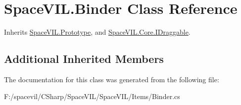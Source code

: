 \hypertarget{class_space_v_i_l_1_1_binder}{}\section{Space\+V\+I\+L.\+Binder Class Reference}
\label{class_space_v_i_l_1_1_binder}


Inherits \mbox{\hyperlink{class_space_v_i_l_1_1_prototype}{Space\+V\+I\+L.\+Prototype}}, and \mbox{\hyperlink{interface_space_v_i_l_1_1_core_1_1_i_draggable}{Space\+V\+I\+L.\+Core.\+I\+Draggable}}.

\subsection*{Additional Inherited Members}


The documentation for this class was generated from the following file\+:\begin{DoxyCompactItemize}
\item 
F\+:/spacevil/\+C\+Sharp/\+Space\+V\+I\+L/\+Space\+V\+I\+L/\+Items/Binder.\+cs\end{DoxyCompactItemize}
